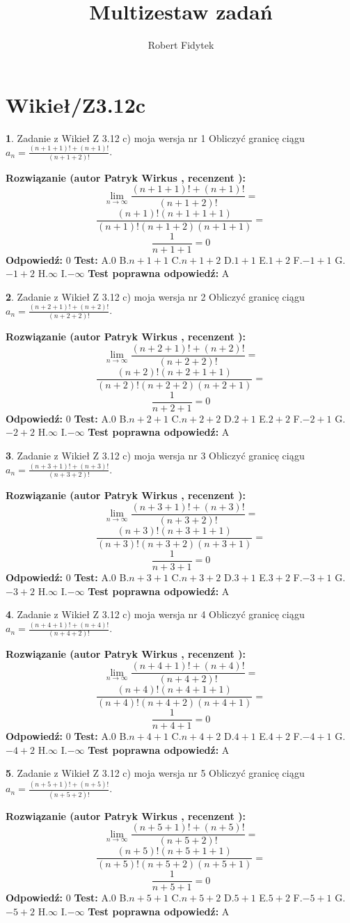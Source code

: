 \documentclass[12pt, a4paper]{article}
\title{Multizestaw zadań}
\author{Robert Fidytek}
\date{}
\theoremstyle{definition} %
\newtheorem{zad}{}
\newcommand{\kategoria}[1]{\section{#1}}
\newcommand{\zadStart}[1]{\begin{zad}#1\newline}
\newcommand{\zadStop}{\end{zad}}
\newcommand{\rozwStart}[2]{\noindent \textbf{Rozwiązanie (autor #1 , recenzent #2): }\newline}
\newcommand{\rozwStop}{\newline}
\newcommand{\odpStart}{\noindent \textbf{Odpowiedź:}\newline}
\newcommand{\odpStop}{\newline}
\newcommand{\testStart}{\noindent \textbf{Test:}\newline}
\newcommand{\testStop}{\newline}
\newcommand{\kluczStart}{\noindent \textbf{Test poprawna odpowiedź:}\newline}
\newcommand{\kluczStop}{\newline}
\begin{document}
\maketitle

\kategoria{Wikieł/Z3.12c}


\zadStart{Zadanie z Wikieł Z 3.12 c) moja wersja nr 1}
Obliczyć granicę ciągu $a_{n}=\frac{(n+1+1)!+(n+1)!}{(n+1+2)!}$.
\zadStop
\rozwStart{Patryk Wirkus}{}
$$\lim\limits_{n\to\infty}\frac{(n+1+1)!+(n+1)!}{(n+1+2)!}=$$
$$\frac{(n+1)!(n+1+1+1)}{(n+1)!(n+1+2)(n+1+1)}=$$
$$\frac{1}{n+1+1}= 0$$
\rozwStop
\odpStart
$0$
\odpStop
\testStart
A.$0$
B.$n+1+1$
C.$n+1+2$
D.$1+1$
E.$1+2$
F.$-1+1$
G.$-1+2$
H.$\infty$
I.$-\infty$
\testStop
\kluczStart
A
\kluczStop



\zadStart{Zadanie z Wikieł Z 3.12 c) moja wersja nr 2}
Obliczyć granicę ciągu $a_{n}=\frac{(n+2+1)!+(n+2)!}{(n+2+2)!}$.
\zadStop
\rozwStart{Patryk Wirkus}{}
$$\lim\limits_{n\to\infty}\frac{(n+2+1)!+(n+2)!}{(n+2+2)!}=$$
$$\frac{(n+2)!(n+2+1+1)}{(n+2)!(n+2+2)(n+2+1)}=$$
$$\frac{1}{n+2+1}= 0$$
\rozwStop
\odpStart
$0$
\odpStop
\testStart
A.$0$
B.$n+2+1$
C.$n+2+2$
D.$2+1$
E.$2+2$
F.$-2+1$
G.$-2+2$
H.$\infty$
I.$-\infty$
\testStop
\kluczStart
A
\kluczStop



\zadStart{Zadanie z Wikieł Z 3.12 c) moja wersja nr 3}
Obliczyć granicę ciągu $a_{n}=\frac{(n+3+1)!+(n+3)!}{(n+3+2)!}$.
\zadStop
\rozwStart{Patryk Wirkus}{}
$$\lim\limits_{n\to\infty}\frac{(n+3+1)!+(n+3)!}{(n+3+2)!}=$$
$$\frac{(n+3)!(n+3+1+1)}{(n+3)!(n+3+2)(n+3+1)}=$$
$$\frac{1}{n+3+1}= 0$$
\rozwStop
\odpStart
$0$
\odpStop
\testStart
A.$0$
B.$n+3+1$
C.$n+3+2$
D.$3+1$
E.$3+2$
F.$-3+1$
G.$-3+2$
H.$\infty$
I.$-\infty$
\testStop
\kluczStart
A
\kluczStop



\zadStart{Zadanie z Wikieł Z 3.12 c) moja wersja nr 4}
Obliczyć granicę ciągu $a_{n}=\frac{(n+4+1)!+(n+4)!}{(n+4+2)!}$.
\zadStop
\rozwStart{Patryk Wirkus}{}
$$\lim\limits_{n\to\infty}\frac{(n+4+1)!+(n+4)!}{(n+4+2)!}=$$
$$\frac{(n+4)!(n+4+1+1)}{(n+4)!(n+4+2)(n+4+1)}=$$
$$\frac{1}{n+4+1}= 0$$
\rozwStop
\odpStart
$0$
\odpStop
\testStart
A.$0$
B.$n+4+1$
C.$n+4+2$
D.$4+1$
E.$4+2$
F.$-4+1$
G.$-4+2$
H.$\infty$
I.$-\infty$
\testStop
\kluczStart
A
\kluczStop



\zadStart{Zadanie z Wikieł Z 3.12 c) moja wersja nr 5}
Obliczyć granicę ciągu $a_{n}=\frac{(n+5+1)!+(n+5)!}{(n+5+2)!}$.
\zadStop
\rozwStart{Patryk Wirkus}{}
$$\lim\limits_{n\to\infty}\frac{(n+5+1)!+(n+5)!}{(n+5+2)!}=$$
$$\frac{(n+5)!(n+5+1+1)}{(n+5)!(n+5+2)(n+5+1)}=$$
$$\frac{1}{n+5+1}= 0$$
\rozwStop
\odpStart
$0$
\odpStop
\testStart
A.$0$
B.$n+5+1$
C.$n+5+2$
D.$5+1$
E.$5+2$
F.$-5+1$
G.$-5+2$
H.$\infty$
I.$-\infty$
\testStop
\kluczStart
A
\kluczStop
\end{document}
